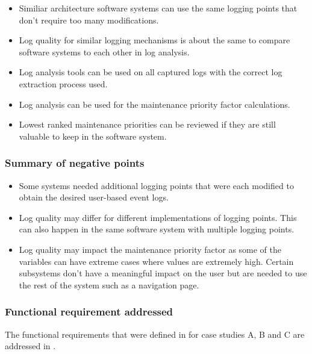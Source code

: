 \begin{itemize}
	\item Similiar architecture software systems can use the same logging points that don't require too many modifications.
	\item Log quality for similar logging mechanisms is about the same to compare software systems to each other in log analysis.
	\item Log analysis tools can be used on all captured logs with the correct log extraction process used.
	\item Log analysis can be used for the maintenance priority factor calculations.
	\item Lowest ranked maintenance priorities can be reviewed if they are still valuable to keep in the software system.
\end{itemize}

\subsubsection{Summary of negative points}

\begin{itemize}
	\item Some systems needed additional logging points that were each modified to obtain the desired user-based event logs.
	\item Log quality may differ for different implementations of logging points. This can also happen in the same software system with multiple logging points.
	\item Log quality may impact the maintenance priority factor as some of the variables can have extreme cases where values are extremely high. Certain subsystems don't have a meaningful impact on the user but are needed to use the rest of the system such as a navigation page.
\end{itemize}

\clearpage

\subsubsection{Functional requirement addressed}
The functional requirements that were defined in  for case studies A, B and C are addressed in .

